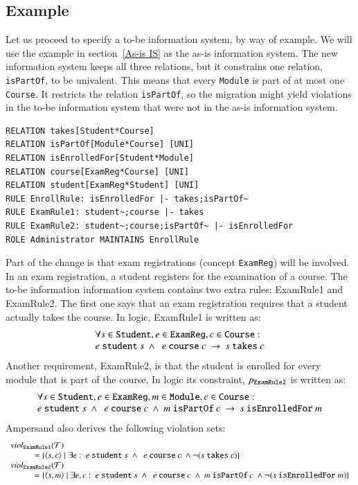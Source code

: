 \documentclass{elsarticle}
\begin{document}
\subsection{Example}
	Let us proceed to specify a to-be information system, by way of example.
	We will use the example in section~\ref{As-is IS} as the as-is information system.
	The new information system keeps all three relations, but it constrains one relation, \verb-isPartOf-, to be univalent.
	This means that every \verb-Module- is part of at most one \verb-Course-.
	It restricts the relation \verb-isPartOf-,
	so the migration might yield violations in the to-be information system that were not in the as-is information system.
\begin{verbatim}
RELATION takes[Student*Course]
RELATION isPartOf[Module*Course] [UNI]
RELATION isEnrolledFor[Student*Module]
RELATION course[ExamReg*Course] [UNI]
RELATION student[ExamReg*Student] [UNI]
RULE EnrollRule: isEnrolledFor |- takes;isPartOf~
RULE ExamRule1: student~;course |- takes
RULE ExamRule2: student~;course;isPartOf~ |- isEnrolledFor
ROLE Administrator MAINTAINS EnrollRule
\end{verbatim}
	Part of the change is that exam registrations (concept \verb-ExamReg-) will be involved.
	In an exam registration, a student registers for the examination of a course.
	The to-be information information system contains two extra rules: ExamRule1 and ExamRule2.
	The first one says that an exam registration requires that a student actually takes the course.
	In logic, ExamRule1 is written as:
\[\begin{array}{l}\forall s\in\text{\tt Student}, e\in\text{\tt ExamReg}, c\in\text{\tt Course}:\\
	e\ \text{\tt student}\ s\ \wedge\ \ e\ \text{\tt course}\ c\ \rightarrow\ s\ \text{\tt takes}\ c\\
\end{array}\]
	Another requirement, ExamRule2, is that the student is enrolled for every module that is part of the course.
	In logic its constraint, $p_{\tt ExamRule2}$ is written as:
\[\begin{array}{l}\forall s\in\text{\tt Student}, e\in\text{\tt ExamReg}, m\in\text{\tt Module}, c\in\text{\tt Course}:\\
	e\ \text{\tt student}\ s\ \wedge\ \ e\ \text{\tt course}\ c\ \wedge\ m\ \text{\tt isPartOf}\ c\ \rightarrow\ s\ \text{\tt isEnrolledFor}\ m
\end{array}\]
	Ampersand also derives the following violation sets:
\[\begin{array}{l}
	\viol{\text{\tt ExamRule1}}{\triples}\\
	\hspace{1cm}=\{\pair{s}{c}\mid\exists e:\ e\ \text{\tt student}\ s\ \wedge\ \ e\ \text{\tt course}\ c\ \wedge\neg(s\ \text{\tt takes}\ c)\}\\
	\viol{\text{\tt ExamRule2}}{\triples}\\
	\hspace{1cm}=\{\pair{s}{m}\mid\exists e,c:\ e\ \text{\tt student}\ s\ \wedge\ \ e\ \text{\tt course}\ c\ \wedge\ m\ \text{\tt isPartOf}\ c\ \wedge\neg(s\ \text{\tt isEnrolledFor}\ m)\}
\end{array}\]
\end{document}
